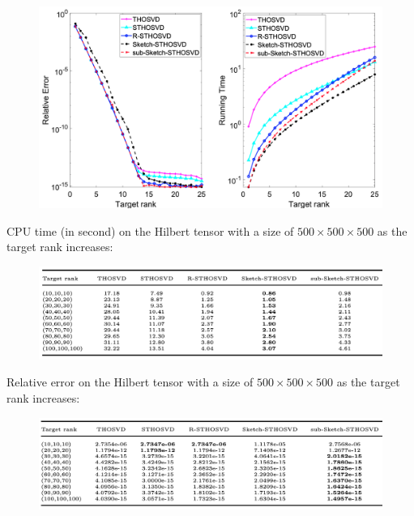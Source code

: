 \documentclass{beamer}
\begin{document}
\begin{frame}{}

\begin{figure}
    \centering
    \includegraphics[width =.8\textwidth]{Graphics/HilbertTensor.png}
\end{figure}
\end{frame}

\begin{frame}{}
CPU time (in second) on the Hilbert tensor
with a size of $500 \times 500 \times 500$ as the target rank increases:
\begin{figure}
    \centering
    \includegraphics[width =\textwidth]{Graphics/HilbertTab1.png}
\end{figure}

Relative error on the Hilbert tensor with a
size of $500 \times 500 \times 500$ as the target rank increases:
\begin{figure}
    \centering
    \includegraphics[width =\textwidth]{Graphics/HilbertTab2.png}
\end{figure}
    
\end{frame}
\end{document}
